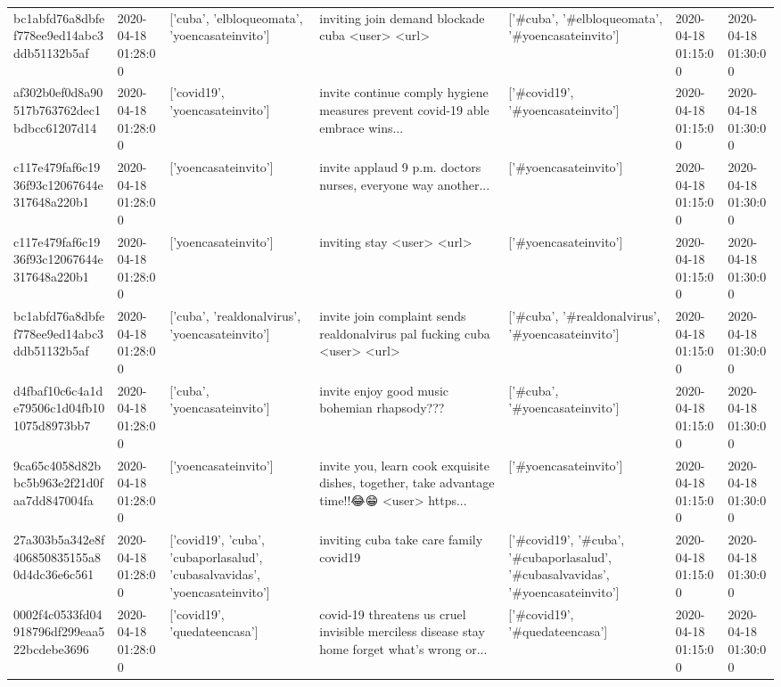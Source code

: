 \begin{tabular}{lllllll}
bc1abfd76a8dbfef778ee9ed14abc3ddb51132b5af & 2020-04-18 01:28:00 & ['cuba', 'elbloqueomata', 'yoencasateinvito'] & inviting join demand blockade cuba <user> <url> & ['#cuba', '#elbloqueomata', '#yoencasateinvito'] & 2020-04-18 01:15:00 & 2020-04-18 01:30:00 \\
af302b0ef0d8a90517b763762dec1bdbcc61207d14 & 2020-04-18 01:28:00 & ['covid19', 'yoencasateinvito'] & invite continue comply hygiene measures prevent covid-19 able embrace wins... & ['#covid19', '#yoencasateinvito'] & 2020-04-18 01:15:00 & 2020-04-18 01:30:00 \\
c117e479faf6c1936f93c12067644e317648a220b1 & 2020-04-18 01:28:00 & ['yoencasateinvito'] & invite applaud 9 p.m. doctors nurses, everyone way another... & ['#yoencasateinvito'] & 2020-04-18 01:15:00 & 2020-04-18 01:30:00 \\
c117e479faf6c1936f93c12067644e317648a220b1 & 2020-04-18 01:28:00 & ['yoencasateinvito'] & inviting stay <user> <url> & ['#yoencasateinvito'] & 2020-04-18 01:15:00 & 2020-04-18 01:30:00 \\
bc1abfd76a8dbfef778ee9ed14abc3ddb51132b5af & 2020-04-18 01:28:00 & ['cuba', 'realdonalvirus', 'yoencasateinvito'] & invite join complaint sends realdonalvirus pal fucking cuba <user> <url> & ['#cuba', '#realdonalvirus', '#yoencasateinvito'] & 2020-04-18 01:15:00 & 2020-04-18 01:30:00 \\
d4fbaf10c6c4a1de79506c1d04fb101075d8973bb7 & 2020-04-18 01:28:00 & ['cuba', 'yoencasateinvito'] & invite enjoy good music bohemian rhapsody??? & ['#cuba', '#yoencasateinvito'] & 2020-04-18 01:15:00 & 2020-04-18 01:30:00 \\
9ca65c4058d82bbc5b963e2f21d0faa7dd847004fa & 2020-04-18 01:28:00 & ['yoencasateinvito'] & invite you, learn cook exquisite dishes, together, take advantage time!!😂😁 <user> https... & ['#yoencasateinvito'] & 2020-04-18 01:15:00 & 2020-04-18 01:30:00 \\
27a303b5a342e8f406850835155a80d4dc36e6c561 & 2020-04-18 01:28:00 & ['covid19', 'cuba', 'cubaporlasalud', 'cubasalvavidas', 'yoencasateinvito'] & inviting cuba take care family covid19 & ['#covid19', '#cuba', '#cubaporlasalud', '#cubasalvavidas', '#yoencasateinvito'] & 2020-04-18 01:15:00 & 2020-04-18 01:30:00 \\
0002f4c0533fd04918796df299eaa522bcdebe3696 & 2020-04-18 01:28:00 & ['covid19', 'quedateencasa'] & covid-19 threatens us cruel invisible merciless disease stay home forget what's wrong or... & ['#covid19', '#quedateencasa'] & 2020-04-18 01:15:00 & 2020-04-18 01:30:00 \\

\end{tabular}
